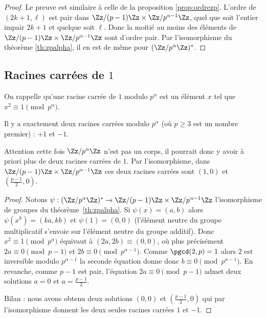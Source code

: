 \documentclass[11pt,class=report,crop=false]{standalone}
\begin{document}
\begin{proof}
Le preuve est similaire à celle de la proposition \ref{prop:ordrezp}.
L'ordre de $(2k+1,\ell)$ est pair dans $\Zz/(p-1)\Zz \times \Zz/p^{\alpha-1}\Zz$, quel que soit l'entier impair $2k+1$ et quelque soit $\ell$. Donc la moitié au moins des éléments de $\Zz/(p-1)\Zz \times \Zz/p^{\alpha-1}\Zz$ sont d'ordre pair. 
Par l'isomorphisme du théorème \ref{th:zpalpha}, il en est de même pour $(\Zz/p^\alpha\Zz)^*$.
\end{proof}


\subsection{Racines carrées de $1$}

On rappelle qu'une racine carrée de $1$ modulo $p^\alpha$ est un élément $x$ tel que $x^2 \equiv 1 \pmod{p^\alpha}$. 

\begin{proposition}
\label{prop:racinezpalpha}
Il y a exactement deux racines carrées modulo $p^\alpha$ (où $p\ge3$ est un nombre premier) : $+1$ et $-1$.
\end{proposition}

Attention cette fois $\Zz/p^\alpha\Zz$ n'est pas un corps, il pourrait donc y avoir à priori plus de deux racines carrées de $1$.
Par l'isomorphisme, dans $\Zz/(p-1)\Zz \times \Zz/p^{\alpha-1}\Zz$ ces deux racines carrées sont $(1,0)$ et $(\frac{p-1}{2},0)$.

\begin{proof}
Notons $\psi :  (\Zz/p^\alpha\Zz)^* \to \Zz/(p-1)\Zz\times \Zz/p^{\alpha-1}\Zz$ l'isomorphisme de groupes du théorème~\ref{th:zpalpha}.
Si $\psi(x)=(a,b)$ alors $\psi(x^k) = (ka,kb)$ et $\psi(1)=(0,0)$ (l'élément neutre du groupe multiplicatif s'envoie sur l'élément neutre du groupe additif).
Donc $x^2 \equiv 1 \pmod{p^\alpha}$ équivaut à $(2a,2b) \equiv (0,0)$,
où plus précisément $2a \equiv 0 \pmod{p-1}$ et $2b \equiv 0 \pmod{p^{\alpha-1}}$.
Comme $\pgcd(2,p)=1$ alors $2$ est inversible modulo $p^{\alpha-1}$ la seconde équation donne donc $b\equiv 0 \pmod{p^{\alpha-1}}$.
En revanche, comme $p-1$ est pair, l'équation $2a \equiv 0 \pmod{p-1}$
admet deux solutions $a=0$ et $a=\frac{p-1}{2}$.
 
Bilan : nous avons obtenu deux solutions $(0,0)$ et $(\frac{p-1}{2},0)$ qui par l'isomorphisme donnent les deux seules racines carrées $1$ et $-1$.
\end{proof}
\end{document}
